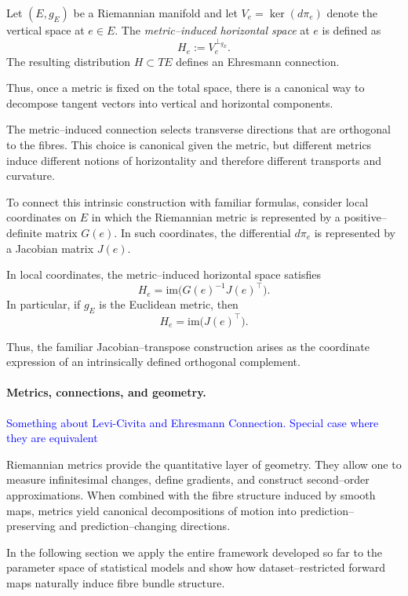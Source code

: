 \begin{gdefn}
Let $(E,g_E)$ be a Riemannian manifold and let
$V_e=\ker(d\pi_e)$ denote the vertical space at $e\in E$.
The \emph{metric--induced horizontal space} at $e$ is defined as
\[
H_e := V_e^{\perp_{g_E}}.
\]
The resulting distribution $H\subset TE$ defines an Ehresmann connection.
\end{gdefn}

Thus, once a metric is fixed on the total space, there is a canonical way to decompose
tangent vectors into vertical and horizontal components.

The metric--induced connection selects transverse directions that are orthogonal to the
fibres.
This choice is canonical given the metric, but different metrics induce different notions
of horizontality and therefore different transports and curvature.

To connect this intrinsic construction with familiar formulas, consider local coordinates
on $E$ in which the Riemannian metric is represented by a positive--definite matrix
$G(e)$.
In such coordinates, the differential $d\pi_e$ is represented by a Jacobian matrix
$J(e)$.

\begin{gprop}
In local coordinates, the metric--induced horizontal space satisfies
\[
H_e
=
\mathrm{im}\!\bigl(G(e)^{-1} J(e)^\top\bigr).
\]
In particular, if $g_E$ is the Euclidean metric, then
\[
H_e = \mathrm{im}\!\bigl(J(e)^\top\bigr).
\]
\end{gprop}

Thus, the familiar Jacobian--transpose construction arises as the coordinate expression
of an intrinsically defined orthogonal complement.

\paragraph{Metrics, connections, and geometry.}
\textcolor{blue}{Something about Levi-Civita and Ehresmann Connection. Special case where they are equivalent}


Riemannian metrics provide the quantitative layer of geometry.
They allow one to measure infinitesimal changes, define gradients, and construct
second--order approximations.
When combined with the fibre structure induced by smooth maps, metrics yield canonical
decompositions of motion into prediction--preserving and prediction--changing
directions.

In the following section we apply the entire framework developed so far to the parameter
space of statistical models and show how dataset--restricted forward maps naturally
induce fibre bundle structure.


